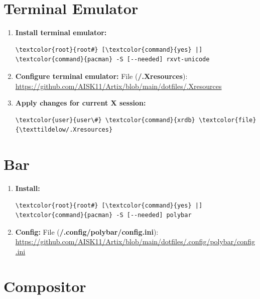 \documentclass[10pt, a4paper, onecolumn, oneside, titlepage, openany]{book}
\begin{document}
\section{Terminal Emulator}
\begin{enumerate}
    \item \textbf{Install terminal emulator:}
\begin{Verbatim}[commandchars=\\\{\}]
\textcolor{root}{root#} [\textcolor{command}{yes} |] \textcolor{command}{pacman} -S [--needed] rxvt-unicode
\end{Verbatim}
    \item \textbf{Configure terminal emulator:}
\newline File (\textbf{\textcolor{file}{\texttildelow/.Xresources}}):
\newline \url{https://github.com/AISK11/Artix/blob/main/dotfiles/.Xresources}
    \item \textbf{Apply changes for current X session:}
\begin{Verbatim}[commandchars=\\\{\}]
\textcolor{user}{user\#} \textcolor{command}{xrdb} \textcolor{file}{\texttildelow/.Xresources}
\end{Verbatim}
\end{enumerate}

\section{Bar}
\begin{enumerate}
    \item \textbf{Install:}
\begin{Verbatim}[commandchars=\\\{\}]
\textcolor{root}{root#} [\textcolor{command}{yes} |] \textcolor{command}{pacman} -S [--needed] polybar
\end{Verbatim}
    \item \textbf{Config:}
\newline File (\textbf{\textcolor{file}{\texttildelow/.config/polybar/config.ini}}):
\newline \url{https://github.com/AISK11/Artix/blob/main/dotfiles/.config/polybar/config.ini}
\end{enumerate}

\section{Compositor}
\end{document}
